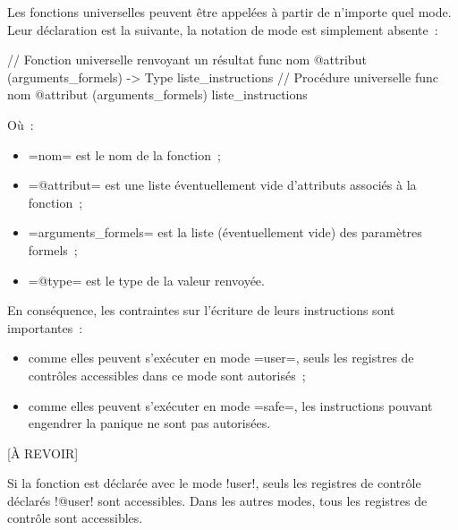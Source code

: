 
Les fonctions universelles peuvent être appelées à partir de n'importe quel mode. Leur déclaration est la suivante, la notation de mode est simplement absente~:

\begin{PLM}
// Fonction universelle renvoyant un résultat
func nom @attribut (arguments_formels) -> Type {
  liste_instructions
}
// Procédure universelle
func nom @attribut (arguments_formels) {
  liste_instructions
}
\end{PLM}
Où~:
\begin{itemize}
  \item \plm=nom= est le nom de la fonction~;
  \item \plm=@attribut= est une liste éventuellement vide d'attributs associés à la fonction~;
  \item \plm=arguments_formels= est la liste (éventuellement vide) des paramètres formels~;
  \item \plm=@type= est le type de la valeur renvoyée.
\end{itemize}

En conséquence, les contraintes sur l'écriture de leurs instructions sont importantes~:
\begin{itemize}
  \item comme elles peuvent s'exécuter en mode \plm=user=, seuls les registres de contrôles accessibles dans ce mode sont autorisés~;
  \item comme elles peuvent s'exécuter en mode \plm=safe=, les instructions pouvant engendrer la panique ne sont pas autorisées.
\end{itemize}














[À REVOIR]

Si la fonction est déclarée avec le mode \plm!user!, seuls les registres de contrôle déclarés \plm!@user! sont accessibles. Dans les autres modes, tous les registres de contrôle sont accessibles.





















